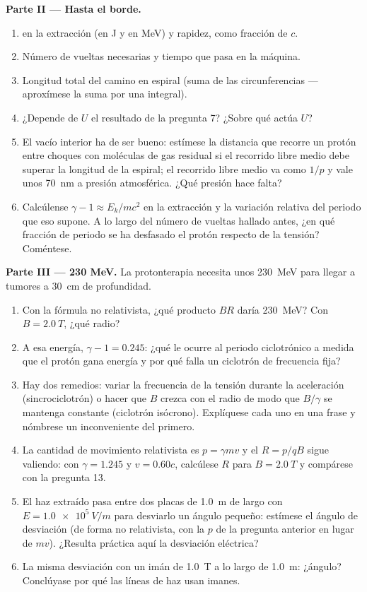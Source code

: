 \begin{problem}
\medskip
\noindent\textbf{Parte II --- Hasta el borde.}
\begin{enumerate}[resume]
  \item {} en la extracción (en J y en MeV) y rapidez, como
        fracción de $c$.
  \item Número de vueltas necesarias y tiempo que pasa en la máquina.
  \item Longitud total del camino en espiral (suma de las circunferencias
        --- aproxímese la suma por una integral).
  \item ¿Depende de $U$ el resultado de la pregunta 7? ¿Sobre qué actúa $U$?
  \item El vacío interior ha de ser bueno: estímese la distancia que
        recorre un protón entre choques con moléculas de gas residual si
        el recorrido libre medio debe superar la longitud de la espiral;
        el recorrido libre medio va como $1/p$ y vale unos \qty{70}{nm} a
        presión atmosférica. ¿Qué presión hace falta?
  \item Calcúlense $\gamma - 1 \approx E_k/mc^2$ en la extracción y la
        variación relativa del periodo que eso supone. A lo largo del
        número de vueltas hallado antes, ¿en qué fracción de periodo se ha
        desfasado el protón respecto de la tensión? Coméntese.
\end{enumerate}

\medskip
\noindent\textbf{Parte III --- 230 MeV.}
La protonterapia necesita unos \qty{230}{MeV} para llegar a tumores a
\qty{30}{cm} de profundidad.
\begin{enumerate}[resume]
  \item Con la fórmula no relativista, ¿qué producto $BR$ daría
        \qty{230}{MeV}? Con $B = \qty{2.0}{T}$, ¿qué radio?
  \item A esa energía, $\gamma - 1 = 0.245$: ¿qué le ocurre al periodo
        ciclotrónico a medida que el protón gana energía y por qué falla
        un ciclotrón de frecuencia fija?
  \item Hay dos remedios: variar la frecuencia de la tensión durante la
        aceleración (sincrociclotrón) o hacer que $B$ crezca con el radio
        de modo que $B/\gamma$ se mantenga constante (ciclotrón isócrono).
        Explíquese cada uno en una frase y nómbrese un inconveniente del
        primero.
  \item La cantidad de movimiento relativista es $p = \gamma mv$ y el $R =
        p/qB$ sigue valiendo: con $\gamma = 1.245$ y $v = 0.60c$,
        calcúlese $R$ para $B = \qty{2.0}{T}$ y compárese con la pregunta 13.
  \item El haz extraído pasa entre dos placas de \qty{1.0}{m} de largo con
        $E = \qty{1.0e5}{V/m}$ para desviarlo un ángulo pequeño: estímese
        el ángulo de desviación (de forma no relativista, con la $p$ de la
        pregunta anterior en lugar de $mv$). ¿Resulta práctica aquí la
        desviación eléctrica?
  \item La misma desviación con un imán de \qty{1.0}{T} a lo largo de
        \qty{1.0}{m}: ¿ángulo? Conclúyase por qué las líneas de haz usan imanes.
\end{enumerate}


\end{problem}
